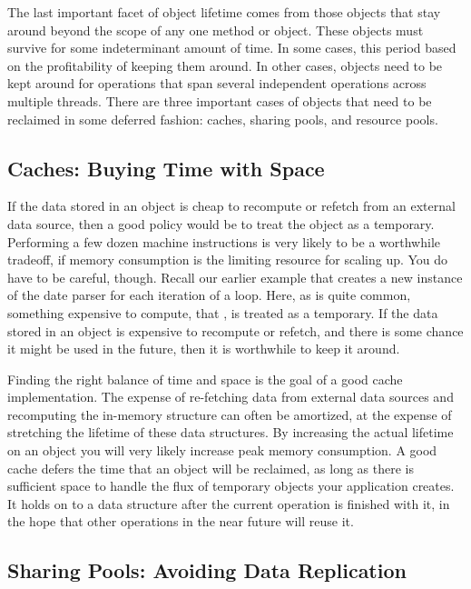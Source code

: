 The last important facet of object lifetime comes from those objects that stay
around beyond the scope of any one method or object. These objects must survive
for some indeterminant amount of time. In some cases, this period based on the
profitability of keeping them around. In other cases, objects need to be kept
around for operations that span several independent operations across multiple
threads.
There are three important cases of objects that need to be reclaimed in some
deferred fashion: caches, sharing pools, and resource pools.

\subsection{Caches: Buying Time with Space}
\label{sec:caches}

If the data stored in an object is cheap to recompute or refetch from an
external data source, then a good policy would be to treat the object as a
temporary. Performing a few dozen machine instructions is very likely to be a
worthwhile tradeoff, if memory consumption is the limiting resource for
scaling up. 
You do have to be careful, though. Recall our earlier example that creates a new
instance of the date parser  for each iteration of a
loop. Here, as is quite common, something expensive to compute, that
, is treated as a temporary. If the data stored in an
object is expensive to recompute or refetch, and there is some chance it might
be used in the future, then it is worthwhile to keep it around.

Finding the right balance of time and space is the goal of a good cache
implementation. The expense of re-fetching data from external data sources and
recomputing the in-memory structure can often be amortized, at the expense of
stretching the lifetime of these data structures. By increasing the actual
lifetime on an object you will very likely increase peak memory consumption. A
good cache defers the time that an object will be reclaimed, as long as there is
sufficient space to handle the flux of temporary objects your application
creates. It holds on to a data structure after the current operation is finished
with it, in the hope that other operations in the near future will reuse it.

\subsection{Sharing Pools: Avoiding Data Replication}
\label{sec:sharing-pools}

